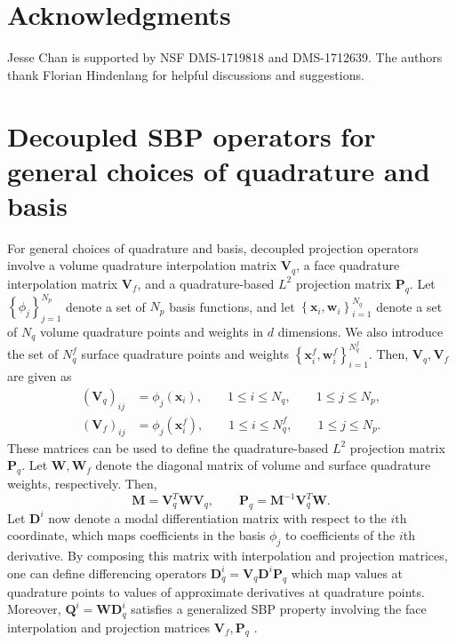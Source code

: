 \documentclass[review,onefignum,onetabnum,final]{siamart171218}
\newcommand{\LRp}[1]{\left( #1 \right)}
\newcommand{\LRc}[1]{\left\{ #1 \right\}}
\newcommand{\note}[1]{{\color{blue}{#1}}}
\begin{document}

\section{Acknowledgments}

Jesse Chan is supported by NSF DMS-1719818 and DMS-1712639.  The authors thank Florian Hindenlang for helpful discussions and suggestions.

\appendix

\section{Decoupled SBP operators for general choices of quadrature and basis}
\label{app:decoupled}

For general choices of quadrature and basis, decoupled projection operators involve a volume quadrature interpolation matrix $\bm{V}_q$, a face quadrature interpolation matrix $\bm{V}_f$, and a quadrature-based $L^2$ projection matrix $\bm{P}_q$.  Let $\LRc{\phi_j}_{j=1}^{N_p}$ denote a set of $N_p$ basis functions, and let $\LRc{\bm{x}_i, \bm{w}_i}_{i = 1}^{N_q}$ denote a set of $N_q$ volume quadrature points and weights in $d$ dimensions.  We also introduce the set of $N^f_q$ surface quadrature points and weights $\LRc{\bm{x}^f_i, \bm{w}^f_i}_{i=1}^{N^f_q}$.  
Then, $\bm{V}_q, \bm{V}_f$ are given as 
\begin{align*}
\LRp{\bm{V}_q}_{ij} &= \phi_j(\bm{x}_i), \qquad 1 \leq i \leq N_q, \qquad 1 \leq j \leq N_p,\\
\LRp{\bm{V}_f}_{ij} &= \phi_j\LRp{\bm{x}^f_i}, \qquad 1 \leq i \leq N^f_q, \qquad 1\leq j \leq N_p.
\end{align*}
These matrices can be used to define the quadrature-based $L^2$ projection matrix $\bm{P}_q$.  Let $\bm{W}, \bm{W}_f$ denote the diagonal matrix of volume and surface quadrature weights, respectively.  Then, 
\[
\bm{M} = \bm{V}_q^T\bm{W}\bm{V}_q, \qquad \bm{P}_q = \bm{M}^{-1}\bm{V}_q^T\bm{W}.  
\]
Let $\bm{D}^i$ now denote a modal differentiation matrix with respect to the $i$th coordinate, which maps coefficients in the basis $\phi_j$ to coefficients of the $i$th derivative.  By composing this matrix with interpolation and projection matrices, one can define differencing operators $\bm{D}_q^i = \bm{V}_q\bm{D}^i\bm{P}_q$ which map values at quadrature points to values of approximate derivatives at quadrature points.  Moreover, $\bm{Q}^i = \bm{W}\bm{D}_q^i$ satisfies a generalized SBP property involving the face interpolation and projection matrices $\bm{V}_f, \bm{P}_q$ \cite{chan2017discretely}.  
\end{document}
